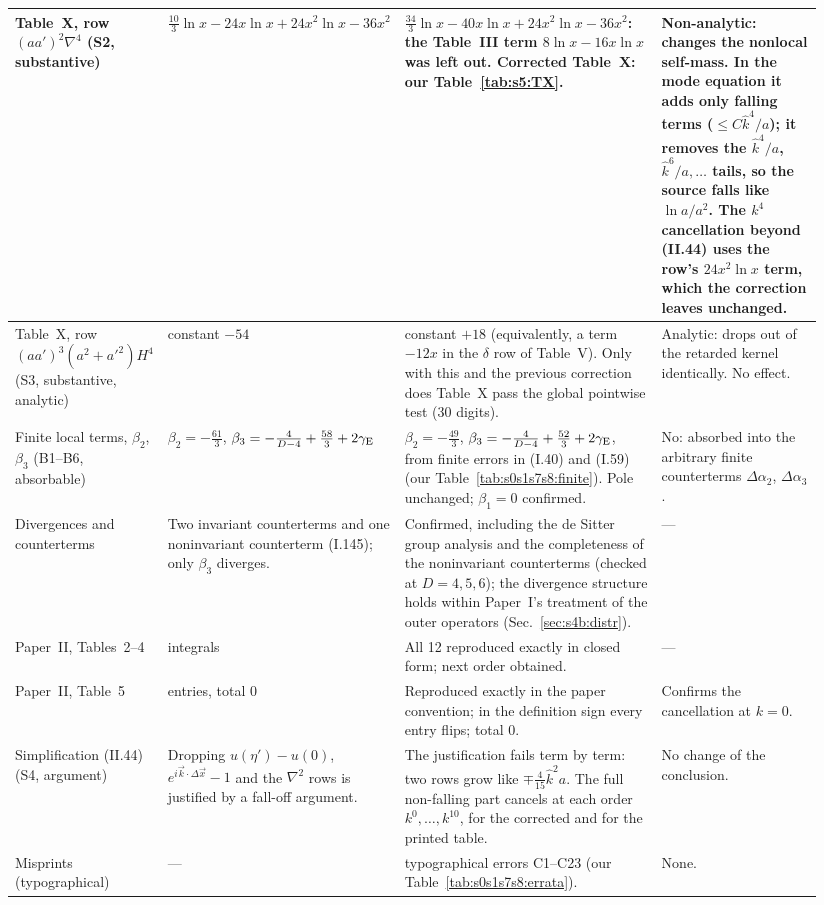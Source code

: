 \documentclass[aps,prd,onecolumn,10pt,nofootinbib,floatfix]{revtex4-2}
\newcommand{\PI}{Paper~I}
\newcommand{\eqI}[1]{(I.#1)}
\newcommand{\eqII}[1]{(II.#1)}
\begin{document}
\begin{table}[tbp]
\begin{ruledtabular}
\begin{tabular}{@{}>{\raggedright\arraybackslash}p{0.15\linewidth}>{\raggedright\arraybackslash}p{0.22\linewidth}%
>{\raggedright\arraybackslash}p{0.33\linewidth}>{\raggedright\arraybackslash}p{0.24\linewidth}@{}}
\hline
Table~X, row $(aa')^2\nabla^4$ (S2, substantive) &
$\tfrac{10}{3}\ln x-24x\ln x+24x^2\ln x-36x^2$ &
$\tfrac{34}{3}\ln x-40x\ln x+24x^2\ln x-36x^2$: the Table~III term $8\ln x-16x\ln x$ was left out. Corrected Table~X:
our Table~\ref{tab:s5:TX}. &
Non-analytic: changes the nonlocal self-mass. In the mode equation it adds only falling terms ($\le C\hat k^4/a$); it removes the
$\hat k^4/a$, $\hat k^6/a,\dots$ tails, so the source falls like $\ln a/a^2$. The $k^4$ cancellation beyond \eqII{44} uses the
row's $24x^2\ln x$ term, which the correction leaves unchanged.\\
\hline
Table~X, row $(aa')^3(a^2+a'^2)H^4$ (S3, substantive, analytic) &
constant $-54$ &
constant $+18$ (equivalently, a term $-12x$ in the $\delta$ row of Table~V). Only with this and the previous correction does Table~X
pass the global pointwise test (30 digits). &
Analytic: drops out of the retarded kernel identically. No effect.\\
\hline
Finite local terms, $\beta_2$, $\beta_3$ (B1--B6, absorbable) &
$\beta_2=-\tfrac{61}{3}$, $\beta_3=-\tfrac{4}{D-4}+\tfrac{58}{3}+2\gamma_{\rm E}$ &
$\beta_2=-\tfrac{49}{3}$, $\beta_3=-\tfrac{4}{D-4}+\tfrac{52}{3}+2\gamma_{\rm E}$, from finite errors in \eqI{40} and \eqI{59}
(our Table~\ref{tab:s0s1s7s8:finite}). Pole unchanged; $\beta_1=0$ confirmed. &
No: absorbed into the arbitrary finite counterterms $\Delta\alpha_2$, $\Delta\alpha_3$.\\
\hline
Divergences and counterterms &
Two invariant counterterms and one noninvariant counterterm \eqI{145}; only $\beta_3$ diverges. &
Confirmed, including the de Sitter group analysis and the completeness of the noninvariant counterterms (checked at $D=4,5,6$);
the divergence structure holds within \PI's treatment of the outer operators (Sec.~\ref{sec:s4b:distr}). &
---\\
\hline
Paper~II, Tables~2--4 &
12 integrals &
All 12 reproduced exactly in closed form; next order obtained. &
---\\
\hline
Paper~II, Table~5 &
19 entries, total $0$ &
Reproduced exactly in the paper convention; in the definition sign every entry flips; total $0$. &
Confirms the cancellation at $k=0$.\\
\hline
Simplification \eqII{44} (S4, argument) &
Dropping $u(\eta')-u(0)$, $e^{i\vec k\cdot\Delta\vec x}-1$ and the $\nabla^2$ rows is justified by a fall-off argument. &
The justification fails term by term: two rows grow like $\mp\tfrac{4}{15}\hat k^2a$. The full non-falling part cancels at each order
$k^0,\dots,k^{10}$, for the corrected and for the printed table. &
No change of the conclusion.\\
\hline
Misprints (typographical) &
--- &
23 typographical errors C1--C23 (our Table~\ref{tab:s0s1s7s8:errata}). &
None.\\
\end{tabular}
\end{ruledtabular}
\end{table}
\end{document}
